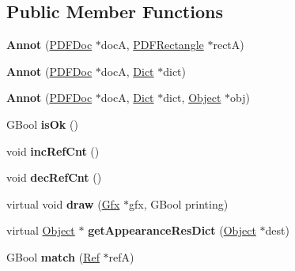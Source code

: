 \subsection*{Public Member Functions}
\begin{DoxyCompactItemize}
\item 
\mbox{\label{class_annot_a9ac05b64627b235b450f5442cbfd4b7f}} 
{\bfseries Annot} (\hyperlink{class_p_d_f_doc}{P\+D\+F\+Doc} $\ast$docA, \hyperlink{class_p_d_f_rectangle}{P\+D\+F\+Rectangle} $\ast$rectA)
\item 
\mbox{\label{class_annot_aaff5a9805957e346c785571328be9b8f}} 
{\bfseries Annot} (\hyperlink{class_p_d_f_doc}{P\+D\+F\+Doc} $\ast$docA, \hyperlink{class_dict}{Dict} $\ast$dict)
\item 
\mbox{\label{class_annot_a50aa1f4b30b98f54afcfac9fa6e326f9}} 
{\bfseries Annot} (\hyperlink{class_p_d_f_doc}{P\+D\+F\+Doc} $\ast$docA, \hyperlink{class_dict}{Dict} $\ast$dict, \hyperlink{class_object}{Object} $\ast$obj)
\item 
\mbox{\label{class_annot_ab2ea5062aa8bdf1f473ff95bee7d5d82}} 
G\+Bool {\bfseries is\+Ok} ()
\item 
\mbox{\label{class_annot_abd65ea8a404b53e5f36d5b523d767ec0}} 
void {\bfseries inc\+Ref\+Cnt} ()
\item 
\mbox{\label{class_annot_a9c9fe37fbaf75618d777271cf36a18df}} 
void {\bfseries dec\+Ref\+Cnt} ()
\item 
\mbox{\label{class_annot_acaf56eec2bc5fc9304b6d292667160be}} 
virtual void {\bfseries draw} (\hyperlink{class_gfx}{Gfx} $\ast$gfx, G\+Bool printing)
\item 
\mbox{\label{class_annot_af59cd01414326a38bdd025bfce511abb}} 
virtual \hyperlink{class_object}{Object} $\ast$ {\bfseries get\+Appearance\+Res\+Dict} (\hyperlink{class_object}{Object} $\ast$dest)
\item 
\mbox{\label{class_annot_a363f19f74c55f0ee8e2dc6adb9e32f47}} 
G\+Bool {\bfseries match} (\hyperlink{struct_ref}{Ref} $\ast$refA)
\item 

\end{DoxyCompactItemize}
